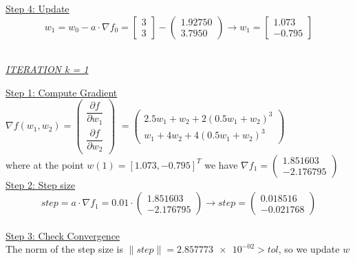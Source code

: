 \underline{Step 4: Update}
\[ 
w_1 = w_0 - a\cdot \nabla f_0 =  \left[\begin{array}{c}
	3 \\
	3
\end{array}\right] - \left(\begin{array}{c}
1.92750 \\
3.7950
\end{array}\right) \rightarrow
w_1 = \left[\begin{array}{c}
	 1.073\\
	 -0.795
\end{array}\right]
\]
\\[4mm]

\begin{center}
	\underline{\textit{ITERATION k = 1}}
\end{center}

\underline{Step 1: Compute Gradient}\\
\(\nabla f(w_1,w_2) = \left(\begin{array}{c}
	\dfrac{\partial f}{\partial w_1} \\[4mm]
	\dfrac{\partial f}{\partial w_2}
\end{array}\right)\) $= \left(\begin{array}{c}
	2.5w_1 + w_2 + 2(0.5w_1+w_2)^3\\[1mm]
	w_1 + 4w_2 + 4(0.5w_1+w_2)^3
\end{array}\right)$ \\[3mm]

where at the point $w\left(1\right) = \left[1.073, -0.795\right]^T$ we have $\nabla f_{1} = \left(\begin{array}{c}
	1.851603 \\
	-2.176795
\end{array}\right)$
\\[4mm]

\underline{Step 2: Step size}
\[
step = a \cdot \nabla f_{1} = 0.01 \cdot \left(\begin{array}{c}
1.851603 \\
-2.176795
\end{array}\right) \rightarrow step =\left(\begin{array}{c}
	0.018516 \\
	-0.021768
\end{array}\right)
\]
\\[4mm]

\underline{Step 3: Check Convergence}\\
The norm of the step size is $\| step \| = \num{2.857773e-02 }> tol$, so we update $w$
\\[4mm]

